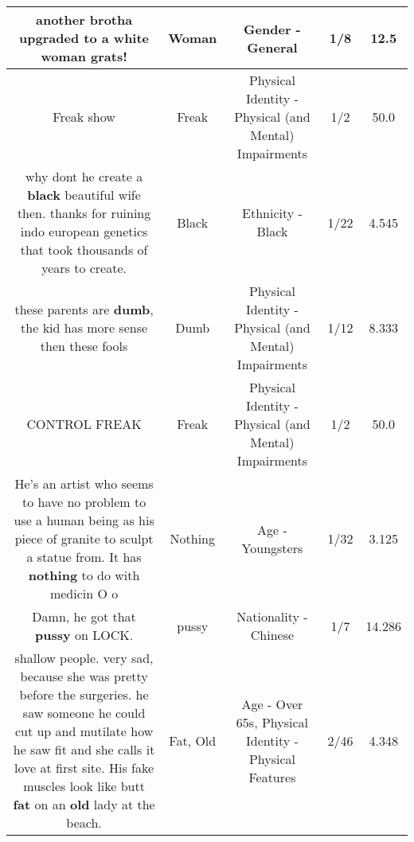 \documentclass[11pt]{article}
\newlength\mylength
\begin{document}
\begin{center}
\begin{longtable}{|C{.65\mylength}|C{.30\mylength}|C{.12\mylength}|C{.12\mylength}|C{.12\mylength}|}
  \small another brotha upgraded to a white \textbf{woman} grats!\normalsize   & Woman & Gender - General & 1/8 & 12.5 \\  \hline
  \small Freak show\normalsize   & Freak & Physical Identity - Physical (and Mental) Impairments & 1/2 & 50.0 \\  \hline
  \small why dont he create a \textbf{black} beautiful wife then. thanks for ruining indo european genetics that took thousands of years to create.\normalsize   & Black & Ethnicity - Black & 1/22 & 4.545 \\  \hline
  \small these parents are \textbf{dumb}, the kid has more sense then these fools\normalsize   & Dumb & Physical Identity - Physical (and Mental) Impairments & 1/12 & 8.333 \\  \hline
  \small CONTROL FREAK\normalsize   & Freak & Physical Identity - Physical (and Mental) Impairments & 1/2 & 50.0 \\  \hline
  \small He's an artist who seems to have no problem to use a human being as his piece of granite to sculpt a statue from. It has \textbf{nothing} to do with medicin O o\normalsize   & Nothing & Age - Youngsters & 1/32 & 3.125 \\  \hline
  \small Damn, he got that \textbf{pussy} on LOCK.\normalsize   & pussy & Nationality - Chinese & 1/7 & 14.286 \\  \hline
  \small shallow people. very sad, because she was pretty before the surgeries. he saw someone he could cut up and mutilate how he saw fit and she calls it love at first site.  His fake muscles look like butt \textbf{fat} on an \textbf{old} lady at the beach.\normalsize   & Fat, Old & Age - Over 65s, Physical Identity - Physical Features & 2/46 & 4.348 \\  \hline

\end{longtable}
\end{center}
\end{document}
